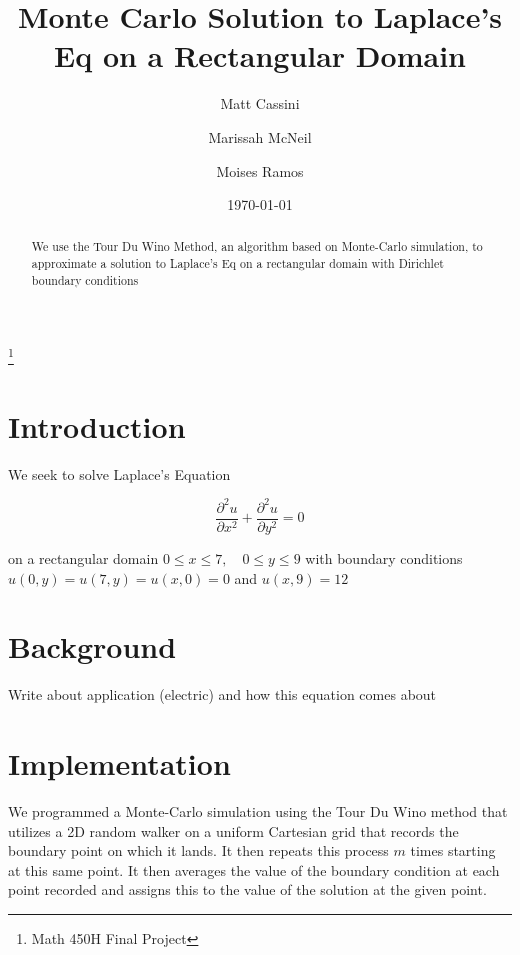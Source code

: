 \documentclass{amsart}
\begin{document}
	
\title{Monte Carlo Solution to Laplace's Eq on a Rectangular Domain}

\author{Matt Cassini}
\address{Department of Mathematical Sciences, New Jersey Institute of Technology, University Heights, Newark, NJ 07102}

\author{Marissah McNeil}
\address{Department of Mathematical Sciences, New Jersey Institute of Technology, University Heights, Newark, NJ 07102}

\author{Moises Ramos}
\address{Department of Mathematical Sciences, New Jersey Institute of Technology, University Heights, Newark, NJ 07102}

\thanks{Math 450H Final Project}
\begin{abstract}
	We use the Tour Du Wino Method, an algorithm based on Monte-Carlo simulation, to approximate a solution to Laplace's Eq on a rectangular domain with Dirichlet boundary conditions
\end{abstract}

\date{\today}
\maketitle



\section{Introduction}
We seek to solve Laplace's Equation

\begin{equation}
	\frac{\partial^2 u}{\partial x^2} + \frac{\partial^2 u}{\partial y^2} = 0
\end{equation}

on a rectangular domain $0 \leq x \leq 7, \quad 0 \leq y \leq 9$ with boundary conditions $u(0,y) = u(7,y) = u(x,0) = 0$ and $u(x,9) = 12$
\section{Background}

Write about application (electric) and how this equation comes about

\section{Implementation}
We programmed a Monte-Carlo simulation using the Tour Du Wino method that utilizes a 2D random walker on a uniform Cartesian grid that records the boundary point on which it lands. It then repeats this process $m$ times starting at this same point. It then averages the value of the boundary condition at each point recorded and assigns this to the value of the solution at the given point.\cite{farlow2012partial}
\end{document}
